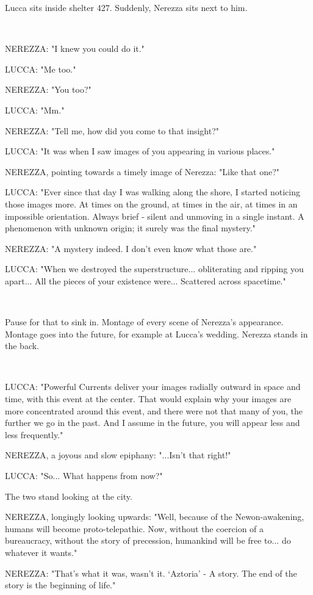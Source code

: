 \documentclass[11pt]{article}
\begin{document}
Lucca sits inside shelter 427. 
Suddenly, Nerezza sits next to him.

\ 

NEREZZA: "I knew you could do it."

LUCCA: "Me too."

NEREZZA: "You too?"

LUCCA: "Mm."

NEREZZA: "Tell me, how did you come to that insight?"

LUCCA: "It was when I saw images of you appearing in various places."

NEREZZA, pointing towards a timely image of Nerezza: "Like that one?"

LUCCA: "Ever since that day I was walking along the shore, I started noticing those images more.
At times on the ground, at times in the air, at times in an impossible orientation. 
Always brief - silent and unmoving in a single instant.
A phenomenon with unknown origin; it surely was the final mystery."

NEREZZA: "A mystery indeed. 
I don't even know what those are."

LUCCA: "When we destroyed the superstructure... obliterating and ripping you apart...
All the pieces of your existence were... 
Scattered across spacetime."

\ 

Pause for that to sink in.
Montage of every scene of Nerezza's appearance.
Montage goes into the future, for example at Lucca's wedding.
Nerezza stands in the back.

\ 

LUCCA: "Powerful Currents deliver your images radially outward in space and time, with this event at the center.
That would explain why your images are more concentrated around this event, and there were not that many of you, the further we go in the past.
And I assume in the future, you will appear less and less frequently."

NEREZZA, a joyous and slow epiphany: "...Isn't that right!"

LUCCA: "So... What happens from now?"


The two stand looking at the city.


NEREZZA, longingly looking upwards: "Well, because of the Newon-awakening, humans will become proto-telepathic. 
Now, without the coercion of a bureaucracy, without the story of precession, humankind will be free to... do whatever it wants."

NEREZZA: "That's what it was, wasn't it. 
`Aztoria' - A story. 
The end of the story is the beginning of life."
\end{document}
